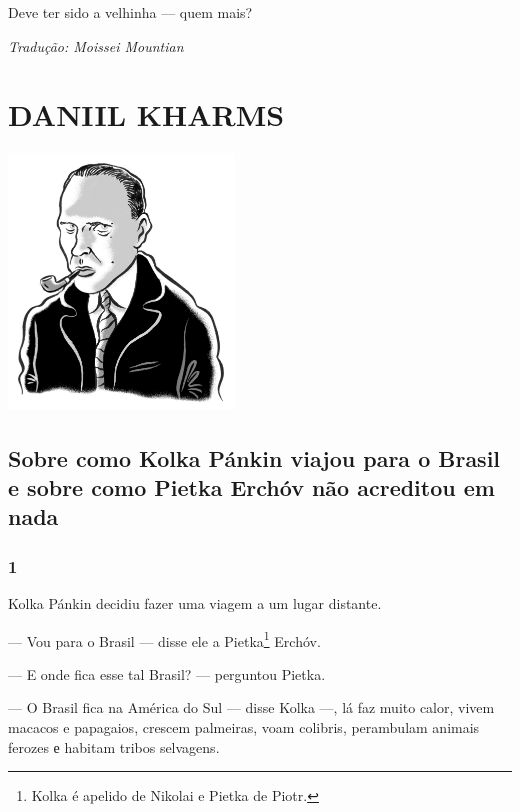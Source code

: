 Deve ter sido a velhinha --- quem mais?

\medskip

{\footnotesize\hfill\emph{Tradução: Moissei Mountian}}




\part[DANIIL KHARMS]{DANIIL KHARMS }

\pagebreak
\thispagestyle{empty}
\mbox{}
\vfill
\begin{center}
\includegraphics[width=6cm]{./imgs/autor12.jpg}
\end{center}

\chapter{Sobre como Kolka Pánkin viajou para o Brasil e sobre como Pietka Erchóv não acreditou em nada} \label{part15}

\section{1}

\noindent{}Kolka Pánkin decidiu fazer uma viagem a um lugar distante.

--- Vou para o Brasil --- disse ele a Pietka\footnote{Kolka é apelido de Nikolai e Pietka de Piotr.} Erchóv.

--- E onde fica esse tal Brasil? --- perguntou Pietka.

--- O Brasil fica na América do Sul --- disse Kolka ---, lá faz muito
calor, vivem macacos e papagaios, crescem palmeiras, voam colibris,
perambulam animais ferozes е habitam tribos selvagens.

